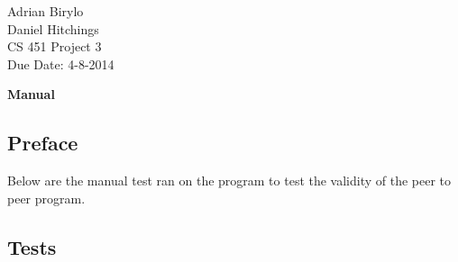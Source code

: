 \documentclass{article}
\begin{document}
\begin{flushright}
Adrian Birylo\\
Daniel Hitchings\\
CS 451 Project 3\\
Due Date: 4-8-2014\\
\end{flushright}

\begin{center}
\textbf{\huge{Manual}}
\end{center}



\subsection*{Preface}
Below are the manual test ran on the program to test the validity of the peer to peer program. 

\subsection*{Tests}
\end{document}
